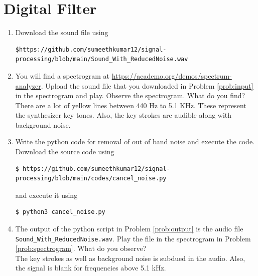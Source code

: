 \documentclass[journal,12pt,twocolumn]{IEEEtran}
\renewcommand\thesection{\arabic{section}}
\begin{document}
\section{Digital Filter}
\begin{enumerate}[label=\thesection.\arabic*
,ref=\thesection.\theenumi]
\item
\label{prob:input}
Download the sound file using
\begin{lstlisting}
$https://github.com/sumeethkumar12/signal-processing/blob/main/Sound_With_ReducedNoise.wav
\end{lstlisting}
\item
\label{prob:spectrogram}
You will find a spectrogram at \href{https://academo.org/demos/spectrum-analyzer}{\url{https://academo.org/demos/spectrum-analyzer}}. Upload the sound file that you downloaded in Problem \ref{prob:input} in the spectrogram and play. Observe the spectrogram. What do you find?
\solution There are a lot of yellow lines between 440 Hz to 5.1 KHz.  These represent the synthesizer key tones. Also, the key strokes
are audible along with background noise.
\item
\label{prob:output}
Write the python code for removal of out of band noise and execute the code.\\
\solution
Download the source code using
\begin{lstlisting}
$ https://github.com/sumeethkumar12/signal-processing/blob/main/codes/cancel_noise.py
\end{lstlisting}
and execute it using
\begin{lstlisting}
$ python3 cancel_noise.py
\end{lstlisting}
\item
The output of the python script in Problem \ref{prob:output} is the audio file \texttt{Sound\_With\_ReducedNoise.wav}. Play the file in the spectrogram in Problem \ref{prob:spectrogram}. What do you observe?\\
\solution The key strokes as well as background noise is subdued in the audio. Also, the signal is blank for frequencies above 5.1 kHz.
\end{enumerate}
\end{document}
